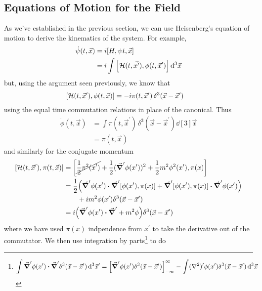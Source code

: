 \documentclass[notes.tex]{subfiles}
\begin{document}
\subsection{Equations of Motion for the Field}
As we've established in the previous section, we can use Heisenberg's equation of motion to derive the kinematics of the system.
For example, 
\begin{align*}
    \dot\psi(t, \vec{x}) &= i \commutator{H}{\psi{t, \vec{x}}}\\
    &= i\int \commutator{\mathcal{H}(t, \vec{x^\prime})}{\phi(t, \vec{x}^\prime)} \dd[3]{\vec{x}}
\end{align*}
but, using the argument seen previously, we know that
\begin{align*}
    \commutator{\mathcal{H}(t, \vec{x}^\prime)}{\phi(t, \vec{x})} &= -i\pi(t, \vec{x}^\prime)\, \delta^3(\vec{x} - \vec{x}^\prime)
\end{align*}
using the equal time commutation relations in place of the canonical. 
Thus
\begin{align*}
    \dot{\phi}(t, \vec{x}) &= \int \pi(t, \vec{x}^\prime)\, \delta^3(\vec{x} - \vec{x}^\prime) \dd[3]\vec{x} \\
    &= \pi(t, \vec{x})
\end{align*}
and similarly for the conjugate momentum
\begin{align*}
    \commutator{\mathcal{H}(t, \vec{x}^\prime)}{\pi(t, \vec{x})} &= \commutator{\cancel{\frac{1}{2}\pi^2(x^\prime)}+\frac{1}{2}(\grad^\prime\phi(x^\prime))^2 + \frac{1}{2}m^2\phi^2(x^\prime)}{\pi(x)}\\
    &= \frac{1}{2}\qty(\grad^\prime\phi(x^\prime)\vdot\grad^\prime\commutator{\phi(x^\prime)}{\pi(x)} + \grad^\prime\commutator{\phi(x^\prime)}{\pi(x)}\vdot \grad^\prime\phi(x^\prime))\\
    &\qquad + im^2\phi(x^\prime)\delta^3(\vec{x} - \vec{x}^\prime)\\
    &= i\qty(\grad^\prime\phi(x^\prime)\vdot\grad^\prime + m^2 \phi)\delta^3(\vec{x} - \vec{x}^\prime)
\end{align*}
where we have used $\pi(x)$ indpendence from $x^\prime$ to take the derivative out of the commutator. 
We then use integration by parts\footnote{\begin{align*}
    \int \grad^\prime\phi(x^\prime)\vdot\grad^\prime \delta^3(\vec{x} - \vec{x}^\prime) \dd[3]{\vec{x}^\prime} &= \qty[\grad^\prime\phi(x^\prime) \delta^3(\vec{x} - \vec{x}^\prime)]_{-\infty}^\infty - \int (\laplacian)^\prime \phi(x^\prime) \delta^3(\vec{x} - \vec{x}^\prime) \dd[3]{\vec{x}}
\end{align*}} to do
\end{document}
